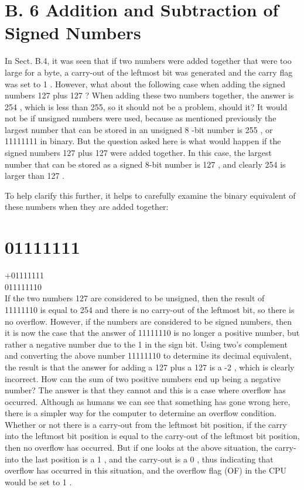 \documentclass[10pt]{book}
\begin{document}
\section*{B. 6 Addition and Subtraction of Signed Numbers}
In Sect. B.4, it was seen that if two numbers were added together that were too large for a byte, a carry-out of the leftmost bit was generated and the carry flag was set to 1 . However, what about the following case when adding the signed numbers 127 plus 127 ? When adding these two numbers together, the answer is 254 , which is less than 255, so it should not be a problem, should it? It would not be if unsigned numbers were used, because as mentioned previously the largest number that can be stored in an unsigned 8 -bit number is 255 , or 11111111 in binary. But the question asked here is what would happen if the signed numbers 127 plus 127 were added together. In this case, the largest number that can be stored as a signed 8-bit number is 127 , and clearly 254 is larger than 127 .

To help clarify this further, it helps to carefully examine the binary equivalent of these numbers when they are added together:

\section*{01111111}
+01111111\\
011111110\\
If the two numbers 127 are considered to be unsigned, then the result of 11111110 is equal to 254 and there is no carry-out of the leftmost bit, so there is no overflow. However, if the numbers are considered to be signed numbers, then it is now the case that the answer of 11111110 is no longer a positive number, but rather a negative number due to the 1 in the sign bit. Using two's complement and converting the above number 11111110 to determine its decimal equivalent, the result is that the answer for adding a 127 plus a 127 is a -2 , which is clearly incorrect. How can the sum of two positive numbers end up being a negative number? The answer is that they cannot and this is a case where overflow has occurred. Although as humans we can see that something has gone wrong here, there is a simpler way for the computer to determine an overflow condition. Whether or not there is a carry-out from the leftmost bit position, if the carry into the leftmost bit position is equal to the carry-out of the leftmost bit position, then no overflow has occurred. But if one looks at the above situation, the carry-into the last position is a 1 , and the carry-out is a 0 , thus indicating that overflow has occurred in this situation, and the overflow flag (OF) in the CPU would be set to 1 .
\end{document}
